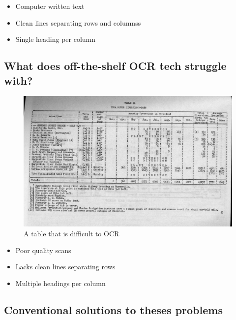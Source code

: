 \documentclass[
  letterpaper,
  DIV=11,
  numbers=noendperiod]{scrartcl}
\providecommand{\tightlist}{%
  \setlength{\itemsep}{0pt}\setlength{\parskip}{0pt}}\usepackage{longtable,booktabs,array}
\begin{document}
\begin{itemize}
\tightlist
\item
  Computer written text
\item
  Clean lines separating rows and columnss
\item
  Single heading per column
\end{itemize}

\hypertarget{what-does-off-the-shelf-ocr-tech-struggle-with}{%
\subsection{What does off-the-shelf OCR tech struggle
with?}\label{what-does-off-the-shelf-ocr-tech-struggle-with}}

\begin{figure}

{\centering \includegraphics{assets/ocr_hard.jpg}

}

\caption{A table that is difficult to OCR}

\end{figure}

\begin{itemize}
\tightlist
\item
  Poor quality scans
\item
  Lacks clean lines separating rows
\item
  Multiple headings per column
\end{itemize}

\hypertarget{conventional-solutions-to-theses-problems}{%
\subsection{Conventional solutions to theses
problems}\label{conventional-solutions-to-theses-problems}}
\end{document}
